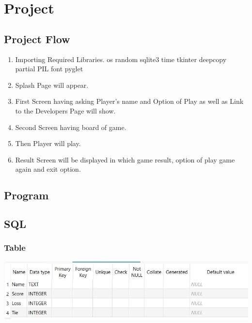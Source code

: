 \chapter{Project}
\section{Project Flow }
\begin{enumerate}
    \item Importing Required Libraries.
        \subitem os 
        \subitem random
        \subitem sqlite3
        \subitem time
        \subitem tkinter
        \subitem deepcopy
        \subitem partial
        \subitem PIL
        \subitem font
        \subitem pyglet
    \item Splash Page will appear.
    \item First Screen having asking Player's name and Option of Play as well as Link to the Developers Page will show.
    \item Second Screen having board of game.
    \item Then Player will play.
    \item Result Screen will be displayed in which game result, option of play game again and exit option. 
\end{enumerate}

\section{Program}


\newpage
\section{SQL}

\subsection{Table}
\hspace{14pt}
\includegraphics[scale=0.685]{figures/sqltable.png}

